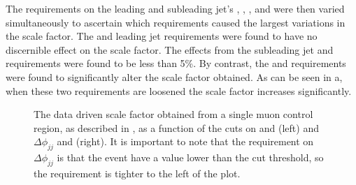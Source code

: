 The requirements on the leading and subleading jet's \pt, \Mjj, \jetmetdphi, \METnoMU and \METsig were then varied simultaneously to ascertain which requirements caused the largest variations in the scale factor. The \METnoMU and leading jet \pt requirements were found to have no discernible effect on the scale factor. The effects from the subleading jet \pt and \METsig requirements were found to be less than 5\%. By contrast, the \jetmetdphi and \Mjj requirements were found to significantly alter the scale factor obtained. As can be seen in a, when these two requirements are loosened the scale factor increases significantly.

\begin{figure}
  \hspace{.1cm}
  \caption{The data driven scale factor obtained from a single muon control region, as described in , as a function of the cuts on \jetmetdphi and \Mjj (left) and $\Delta\phi_{jj}$ and \Mjj (right). It is important to note that the requirement on $\Delta\phi_{jj}$ is that the event have a value lower than the cut threshold, so the requirement is tighter to the left of the plot.}
  \label{fig:jetmetdphimjjscalefactor}
\end{figure}

